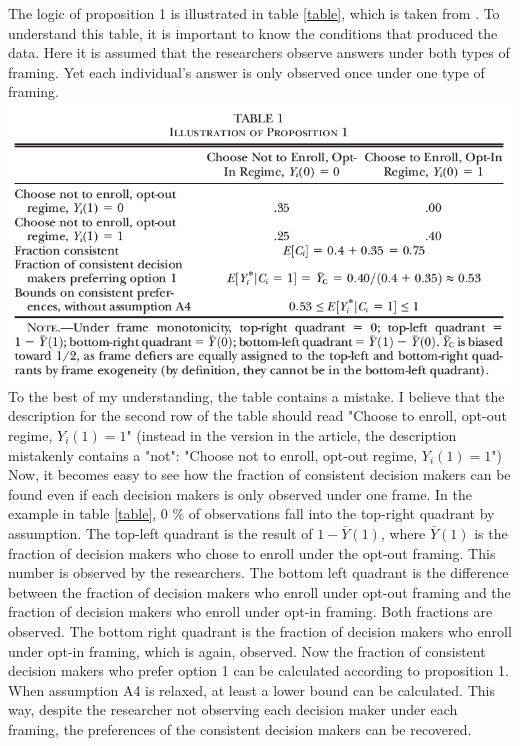 The logic of proposition 1 is illustrated in table \ref{table}, which is taken from \textcite[p. 2769]{goldin2020}. To understand this table, it is important to 
know the conditions that produced the data. Here it is assumed that the researchers observe answers under both types of framing. Yet each individual's answer is only
observed once under one type of framing.
\includegraphics{table.png} \label{table}
To the best of my understanding, the table contains a mistake. I believe that the description for the second row of the table should read
"Choose to enroll, opt-out regime, $ Y_i(1) = 1$" (instead in the version in the article, the description mistakenly contains a "not": "Choose not to enroll, opt-out regime, $ Y_i(1) = 1$")
Now, it becomes easy to see how the fraction of consistent decision makers can be found even if each decision makers is only observed under one frame.
In the example in table \ref{table}, 0 \% of observations fall into the top-right quadrant by assumption.
The top-left quadrant is the result of $1-\bar{Y}(1)$, where $\bar{Y}(1)$
is the fraction of decision makers who chose to enroll under the opt-out framing. This number is observed by the researchers.
The bottom left quadrant is the difference between the fraction of decision makers who enroll under opt-out framing and the fraction
of decision makers who enroll under opt-in framing. Both fractions are observed.
The bottom right quadrant is the fraction of decision makers who enroll under opt-in framing, which is again, observed.
Now the fraction of consistent decision makers who prefer option 1 can be calculated according to proposition 1. When assumption A4 is relaxed,
at least a lower bound can be calculated.
This way, despite the researcher not observing each decision maker under each framing, the preferences of the consistent decision makers can be recovered.

